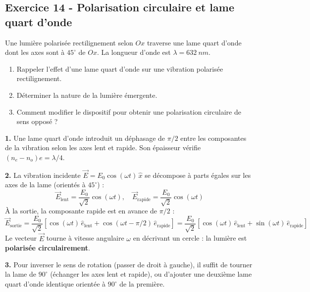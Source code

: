 \documentclass[12pt,a4paper]{article}
\begin{document}
\subsection*{Exercice 14 - Polarisation circulaire et lame quart d'onde \niveau{\moyen}}

\begin{boiteexercice}
Une lumière polarisée rectilignement selon $Ox$ traverse une lame quart d'onde dont les axes sont à $45^\circ$ de $Ox$. La longueur d'onde est $\lambda = \qty{632}{nm}$.
\begin{enumerate}
  \item Rappeler l'effet d'une lame quart d'onde sur une vibration polarisée rectilignement.
  \item Déterminer la nature de la lumière émergente.
  \item Comment modifier le dispositif pour obtenir une polarisation circulaire de sens opposé ?
\end{enumerate}
\end{boiteexercice}

\begin{boitecorrige}
\textbf{1.} Une lame quart d'onde introduit un déphasage de $\pi/2$ entre les composantes de la vibration selon les axes lent et rapide. Son épaisseur vérifie $(n_e - n_o)e = \lambda/4$.

\textbf{2.} La vibration incidente $\vec{E} = E_0\cos(\omega t)\,\hat{x}$ se décompose à parts égales sur les axes de la lame (orientés à $45^\circ$) :
\[
\vec{E}_\text{lent} = \frac{E_0}{\sqrt{2}}\cos(\omega t), \quad \vec{E}_\text{rapide} = \frac{E_0}{\sqrt{2}}\cos(\omega t)
\]
À la sortie, la composante rapide est en avance de $\pi/2$ :
\[
\vec{E}_\text{sortie} = \frac{E_0}{\sqrt{2}}\left[\cos(\omega t)\,\hat{e}_\text{lent} + \cos(\omega t - \pi/2)\,\hat{e}_\text{rapide}\right] = \frac{E_0}{\sqrt{2}}\left[\cos(\omega t)\,\hat{e}_\text{lent} + \sin(\omega t)\,\hat{e}_\text{rapide}\right]
\]
Le vecteur $\vec{E}$ tourne à vitesse angulaire $\omega$ en décrivant un cercle : la lumière est \textbf{polarisée circulairement}.

\textbf{3.} Pour inverser le sens de rotation (passer de droit à gauche), il suffit de tourner la lame de $90^\circ$ (échanger les axes lent et rapide), ou d'ajouter une deuxième lame quart d'onde identique orientée à $90^\circ$ de la première.
\end{boitecorrige}
\end{document}
